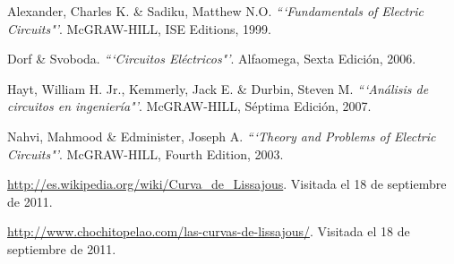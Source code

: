 \documentclass[twocolumn]{IEEEtran}
\begin{document}

\begin{thebibliography}{99}
 Alexander, Charles K. \&  Sadiku, Matthew N.O.
{\em ```Fundamentals of Electric Circuits"'}.
McGRAW-HILL, ISE Editions, 1999.

 Dorf  \& Svoboda.
{\em ```Circuitos Eléctricos"'}.
Alfaomega, Sexta Edición, 2006.

 Hayt, William H. Jr., Kemmerly, Jack E. \& Durbin, Steven M.
{\em ```Análisis de circuitos en ingeniería"'}.
McGRAW-HILL, Séptima Edición, 2007.

 Nahvi, Mahmood \& Edminister, Joseph A.
{\em ```Theory and Problems of Electric Circuits"'}.
McGRAW-HILL, Fourth Edition, 2003.

 \url{http://es.wikipedia.org/wiki/Curva_de_Lissajous}. Visitada el 18 de septiembre de 2011.

 \url{http://www.chochitopelao.com/las-curvas-de-lissajous/}.
Visitada el 18 de septiembre de 2011.

\end{thebibliography}
\end{document}
